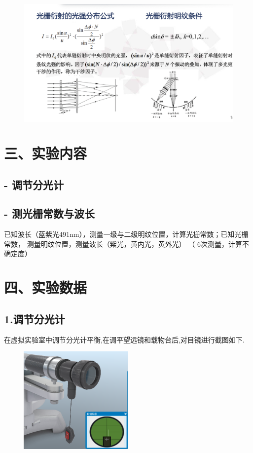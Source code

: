 \documentclass{article}
\begin{document}
    \begin{figure}[H]
        \centering
        \includegraphics[width=1\textwidth]{5.png}
        \end{figure}


\section*{三、实验内容}
\subsection*{- 调节分光计}
\subsection*{- 测光栅常数与波长}
已知波长（蓝紫光491nm），测量一级与二级明纹位置，计算光栅常数；已知光栅常数，
测量明纹位置，测量波长（紫光，黄内光，黄外光）
（ 6次测量，计算不确定度）

\section*{四、实验数据}

\subsection*{1.调节分光计}
在虚拟实验室中调节分光计平衡,在调平望远镜和载物台后,对目镜进行截图如下.
\begin{figure}[H]
    \centering
    \includegraphics[width=0.5\textwidth]{23.png}
    \end{figure}
\end{document}

